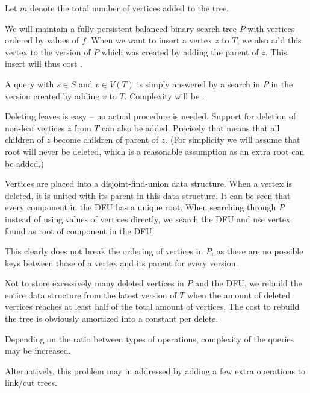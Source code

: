 Let $m$ denote the total number of vertices added to the tree.

We will maintain a fully-persistent balanced binary search tree $P$ with vertices ordered by values of $f$. When we want to insert a vertex $z$ to $T$, we also add this vertex to the version of $P$ which was created by adding the parent of $z$. This insert will thus cost .

A query with $s \in S$ and $v \in V(T)$ is simply answered by a search in $P$ in the version created by adding $v$ to $T$. Complexity will be .

Deleting leaves is easy -- no actual procedure is needed. Support for deletion of non-leaf vertices $z$ from $T$ can also be added. Precisely that means that all children of $z$ become children of parent of $z$. (For simplicity we will assume that root will never be deleted, which is a reasonable assumption as an extra root can be added.) 

Vertices are placed into a disjoint-find-union data structure. When a vertex is deleted, it is united with its parent in this data structure. It can be seen that every component in the DFU has a unique root. When searching through $P$ instead of using values of vertices directly, we search the DFU and use vertex found as root of component in the DFU.

This clearly does not break the ordering of vertices in $P$, as there are no possible keys between those of a vertex and its parent for every version. 
 
Not to store excessively many deleted vertices in $P$ and the DFU, we rebuild the entire data structure from the latest version of $T$ when the amount of deleted vertices reaches at least half of the total amount of vertices. The cost to rebuild the tree is obviously amortized into a constant per delete.
 
Depending on the ratio between types of operations, complexity of the queries may be increased. %

Alternatively, this problem may in addressed by adding a few extra operations to link/cut trees\cite{link-cut}.

